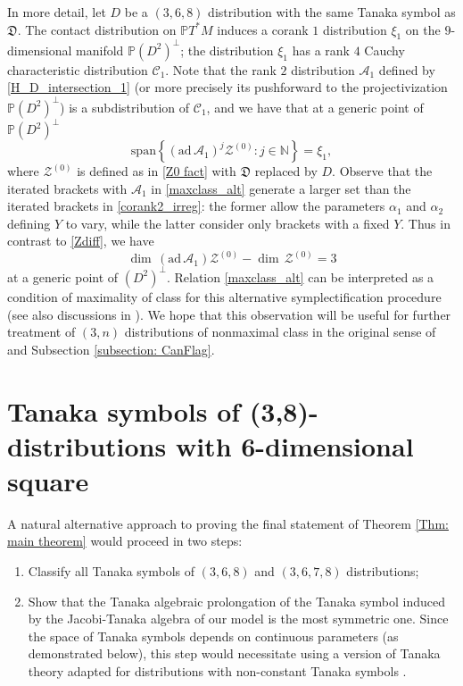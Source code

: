 \documentclass[11pt,letterpaper]{amsart}
\numberwithin{equation}{section}
\begin{document}
In more detail, let $D$ be a $(3,6,8)$ distribution with the same Tanaka symbol as $\mathfrak D$. The contact distribution on $\mathbb PT^*M$ induces a corank $1$ distribution $\xi_1$ on the $9$-dimensional manifold $\mathbb P (D^2)^\perp$; the distribution $\xi_1$ has a rank $4$ Cauchy characteristic distribution $\mathcal C_1$. Note that the rank $2$ distribution $\mathcal A_1$ defined by \eqref{H_D_intersection_1} (or more precisely its pushforward to the projectivization $\mathbb P(D^2)^\perp$) is a subdistribution of $\mathcal C_1$,  and we have that at a generic point of $\mathbb P(D^2)^\perp$ 
\begin{equation}
\label{maxclass_alt} 
    \mathrm{span}\left\{ (\mathrm{ad}\, \mathcal A_1)^j   \mathcal Z^{(0)}:j\in \mathbb N\right\}=\xi_1,
\end{equation}
where $\mathcal Z^{(0)}$ is defined as in \eqref{Z0 fact} with $\mathfrak D$ replaced by $D$. Observe that the iterated brackets with $\mathcal A_1$ in \eqref{maxclass_alt} generate a larger set than the iterated brackets in \eqref{corank2_irreg}: the former allow the parameters $\alpha_1$ and $\alpha_2$ defining $Y$ to vary, while the latter consider only brackets with a fixed $Y$. Thus in contrast to \eqref{Zdiff}, we have
\[
    \dim\, (\mathrm{ad}\, \mathcal A_1) \mathcal Z^{(0)}-\dim\, \mathcal Z^{(0)}=3
\]
at a generic point of $(D^2)^\perp$.
Relation \eqref{maxclass_alt} can be interpreted as a condition of maximality of class for this alternative symplectification procedure (see also discussions in \cite[subsection 4.2.3]{BI2026generalized}). We hope that this observation will be useful for further treatment of $(3,n)$ distributions of nonmaximal class in the original sense of \cite{doubrov2016JacobiCurves} and Subsection \ref{subsection: CanFlag}.

\appendix
\section{Tanaka symbols of (3,8)-distributions with 6-dimensional square}
\label{Appendix}

A natural alternative approach to proving the final statement of Theorem \ref{Thm: main theorem} would proceed in two steps:
\begin{enumerate}
    \item [I.] Classify all Tanaka symbols of $(3,6,8)$  and $(3,6,7,8)$ distributions;
    \item [II.] Show that the Tanaka algebraic prolongation of the Tanaka symbol induced by the Jacobi-Tanaka algebra of our model is the most symmetric one. Since the space of Tanaka symbols depends on continuous parameters (as demonstrated below), this step would necessitate using a version of Tanaka theory adapted for distributions with non-constant Tanaka symbols \cite{Hong_Hwang}.
\end{enumerate}
\end{document}
